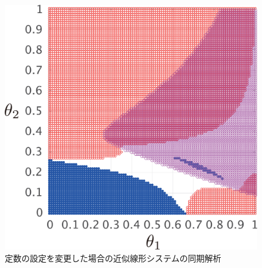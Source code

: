 \documentclass[tombow,dvipdfmx]{corona-a5}
\begin{document}
\begin{figure}[t]
{\begin{minipage}{0.32\linewidth}
    \centering
    \includegraphics[width = .85\linewidth]{figs/gam5ex}
  \end{minipage}
  \caption{定数の設定を変更した場合の近似線形システムの同期解析}
  \label{fig:gamex}
  }
\end{figure}
\end{document}

